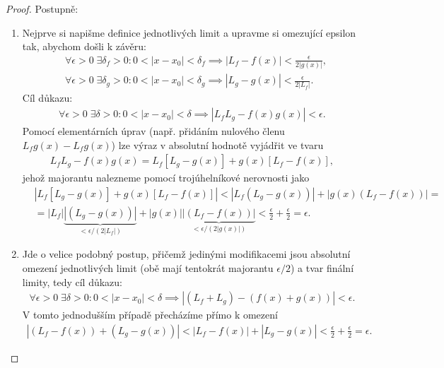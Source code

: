 \documentclass[a4paper,11pt]{article}
\theoremstyle{remark}
\theoremstyle{definition}
\begin{document}
		\begin{proof} Postupně:
			\begin{enumerate}[label=(\arabic*)]
				
				\item
				Nejprve si napišme definice jednotlivých limit a upravme si omezující epsilon tak, abychom došli k  závěru:
				\begin{align*}
					&\forall \epsilon > 0 \; \exists \delta_f > 0 : 0 < |x - x_0| < \delta_f \implies |L_f - f(x)| < \frac{\epsilon}{2 |g(x)|},
				\\
					&\forall \epsilon > 0 \; \exists \delta_g > 0 : 0 < |x - x_0| < \delta_g \implies |L_g - g(x)| < \frac{\epsilon}{2 |L_f|}.
				\end{align*}
				Cíl důkazu:
				\begin{align*}
					\forall \epsilon > 0 \; \exists \delta > 0 : 0 < |x - x_0| < \delta \implies |L_f L_g - f(x)g(x)| < \epsilon.
				\end{align*}
				Pomocí elementárních úprav (např. přidáním nulového členu $L_f g(x) - L_f g(x)$) lze výraz v absolutní hodnotě vyjádřit ve tvaru
				\begin{align*}
					L_f L_g - f(x)g(x) = L_f[L_g - g(x)] + g(x)[L_f - f(x)],
				\end{align*}
				jehož majorantu nalezneme pomocí trojúhelníkové nerovnosti jako
				\begin{align*}
					&|L_f[L_g - g(x)] + g(x)[L_f - f(x)]| < |L_f(L_g - g(x))| + |g(x)(L_f - f(x))| =
				\\
					&= |L_f|\underbrace{|(L_g-g(x))|}_{<\epsilon/(2|L_f|)} + |g(x)| \underbrace{|(L_f-f(x))|}_{<\epsilon/(2|g(x)|)} < \frac{\epsilon}{2} + \frac{\epsilon}{2} = \epsilon.
				\end{align*}
				
				\item Jde o velice podobný postup, přičemž jedinými modifikacemi jsou absolutní omezení jednotlivých limit (obě mají tentokrát majorantu $\epsilon/2$) a tvar finální limity, tedy cíl důkazu:
				\begin{align*}
					\forall \epsilon > 0 \; \exists \delta > 0 : 0 < |x - x_0| < \delta \implies |(L_f + L_g) - (f(x) + g(x))| < \epsilon.
				\end{align*}
				V tomto jednodušším případě přecházíme přímo k omezení
				\begin{align*}
					|(L_f - f(x)) + (L_g - g(x))| < |L_f - f(x)| + |L_g - g(x)| < \frac \epsilon 2 + \frac \epsilon 2 = \epsilon.
				\end{align*}
				
			\end{enumerate}
		\end{proof}
		
\end{document}
